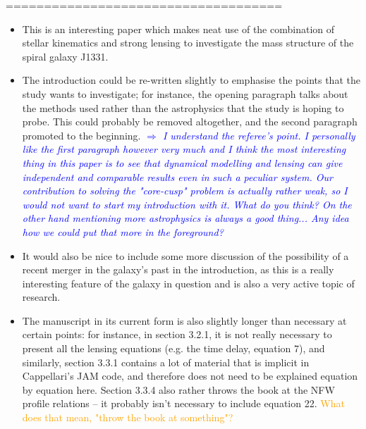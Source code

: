\documentclass[10pt,a4paper]{article}
\newcommand{\Comment}[1]{\textsl{\textcolor{Blue}{$\Longrightarrow$ {#1}}}}
\newcommand{\Aaron}[1]{\textcolor{Orange}{#1}}
\begin{document}
====================================
\begin{itemize}

\item This is an interesting paper which makes neat use of the combination of stellar
kinematics and strong lensing to investigate the mass structure of the spiral galaxy
J1331. 

\item The introduction could be re-written slightly to emphasise the points that the study
wants to investigate; for instance, the opening paragraph talks about the methods
used rather than the astrophysics that the study is hoping to probe. This could
probably be removed altogether, and the second paragraph promoted to the beginning. \Comment{I understand the referee's point. I personally like the first paragraph however very much and I think the most interesting thing in this paper is to see that dynamical modelling and lensing can give independent and comparable results even in such a peculiar system. Our contribution to solving the "core-cusp" problem is actually rather weak, so I would not want to start my introduction with it. What do you think? On the other hand mentioning more astrophysics is always a good thing... Any idea how we could put that more in the foreground?}

\item It would also be nice to include some more discussion of the possibility of a recent
merger in the galaxy's past in the introduction, as this is a really interesting
feature of the galaxy in question and is also a very active topic of research.

\item The manuscript in its current form is also slightly longer than necessary at certain
points: for instance, in section 3.2.1, it is not really necessary to present all
the lensing equations (e.g. the time delay, equation 7), and similarly, section
3.3.1 contains a lot of material that is implicit in Cappellari's JAM code, and
therefore does not need to be explained equation by equation here. Section 3.3.4
also rather throws the book at the NFW profile relations – it probably isn't
necessary to include equation 22. \Aaron{What does that mean, "throw the book at something"?}


\end{itemize}
\end{document}
